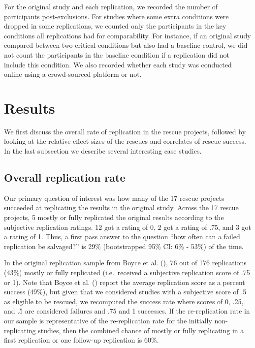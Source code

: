 \documentclass[
  english,
  a4paper,
]{article}
\begin{document}
For the original study and each replication, we recorded the number of participants post-exclusions.
For studies where some extra conditions were dropped in some replications, we counted only the participants in the key conditions all replications had for comparability.
For instance, if an original study compared between two critical conditions but also had a baseline control, we did not count the participants in the baseline condition if a replication did not include this condition.
We also recorded whether each study was conducted online using a crowd-sourced platform or not.

\section{Results}\label{results}

We first discuss the overall rate of replication in the rescue projects, followed by looking at the relative effect sizes of the rescues and correlates of rescue success.
In the last subsection we describe several interesting case studies.

\subsection{Overall replication rate}\label{overall-replication-rate}

Our primary question of interest was how many of the 17 rescue projects succeeded at replicating the results in the original study.
Across the 17 rescue projects, 5 mostly or fully replicated the original results according to the subjective replication ratings.
12 got a rating of 0, 2 got a rating of .75, and 3 got a rating of 1.
Thus, a first pass answer to the question ``how often can a failed replication be salvaged?'' is 29\% (bootstrapped 95\% CI: 6\% - 53\%) of the time.

In the original replication sample from Boyce et al. (), 76 out of 176 replications (43\%) mostly or fully replicated (i.e.~received a subjective replication score of .75 or 1).
Note that Boyce et al. () report the average replication score as a percent success (49\%), but given that we considered studies with a subjective score of .5 as eligible to be rescued, we recomputed the success rate where scores of 0, .25, and .5 are considered failures and .75 and 1 successes.
If the re-replication rate in our sample is representative of the re-replication rate for the initially non-replicating studies, then the combined chance of mostly or fully replicating in a first replication or one follow-up replication is 60\%.
\end{document}
